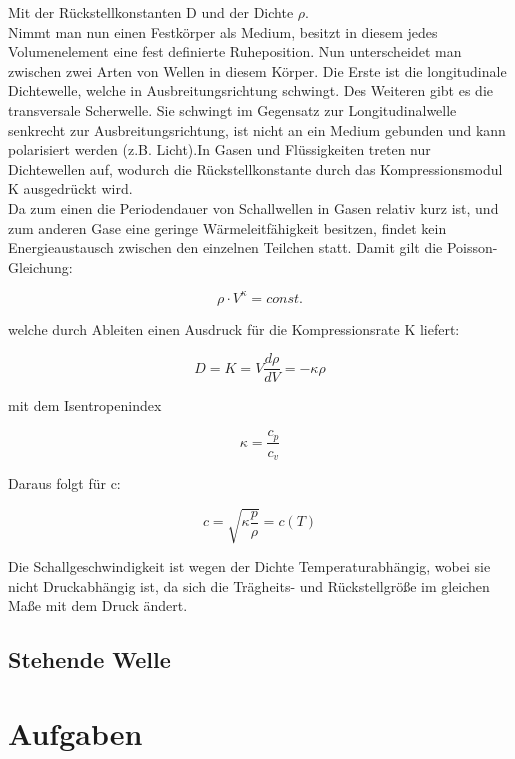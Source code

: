 \documentclass{article}
\begin{document}
{Mit der Rückstellkonstanten D und der Dichte \(\rho\).\\
Nimmt man nun einen Festkörper als Medium, besitzt in diesem jedes Volumenelement eine fest definierte Ruheposition. Nun unterscheidet man zwischen zwei Arten von Wellen in diesem Körper. Die Erste ist die longitudinale Dichtewelle, welche in Ausbreitungsrichtung schwingt. Des Weiteren gibt es die transversale Scherwelle. Sie schwingt im Gegensatz zur Longitudinalwelle senkrecht zur Ausbreitungsrichtung, ist nicht an ein Medium gebunden und kann polarisiert werden (z.B. Licht).In Gasen und Flüssigkeiten treten nur Dichtewellen auf, wodurch die Rückstellkonstante durch das Kompressionsmodul K ausgedrückt wird.\\
Da zum einen die Periodendauer von Schallwellen in Gasen relativ kurz ist, und zum anderen Gase eine geringe Wärmeleitfähigkeit besitzen, findet kein Energieaustausch zwischen den einzelnen Teilchen statt. Damit gilt die Poisson-Gleichung:

\begin{equation}
\label{rho}
\rho \cdot V^{\kappa} = const.
\end{equation}

welche durch Ableiten einen Ausdruck für die Kompressionsrate K liefert:

\begin{equation}
\label{K}
D = K = V \frac{d\rho}{dV}=-\kappa \rho
\end{equation}

mit dem Isentropenindex 

\begin{equation}
\label{kappa}
\kappa = \frac{c_{p}}{c_{v}}
\end{equation}

Daraus folgt für c:

\begin{equation}
c=\sqrt{\kappa\frac{p}{\rho}}=c(T)
\end{equation}

Die Schallgeschwindigkeit ist wegen der Dichte Temperaturabhängig, wobei sie nicht Druckabhängig ist, da sich die Trägheits- und Rückstellgröße im gleichen Maße mit dem Druck ändert.

\newpage
\subsection{Stehende Welle}
\newpage
\section{Aufgaben}
}
\end{document}
